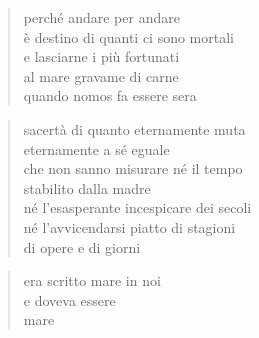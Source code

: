	\begin{verse}
		perché andare per andare\\
		è destino di quanti ci sono mortali\\
		e lasciarne i più fortunati\\
		al mare gravame di carne\\
		quando nomos fa essere sera
	\end{verse}

	\begin{verse}
		sacertà di quanto eternamente muta\\
		eternamente a sé eguale\\
		che non sanno misurare né il tempo\\
		stabilito dalla madre\\
		né l’esasperante incespicare dei secoli\\
		né l’avvicendarsi piatto di stagioni\\
		di opere e di giorni
	\end{verse}

	\begin{verse}
		era scritto mare in noi\\
		e doveva essere\\
		mare
	\end{verse}

